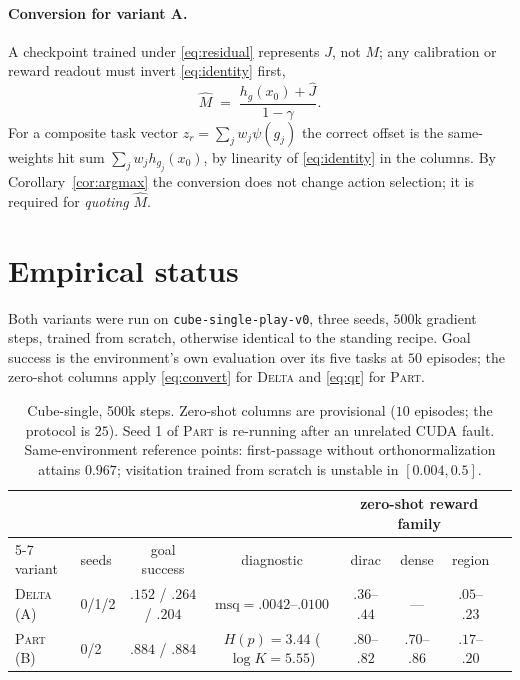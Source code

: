 \documentclass{article}
\begin{document}
\paragraph{Conversion for variant A.} A checkpoint trained under
\eqref{eq:residual} represents $J$, not $M$; any calibration or reward readout
must invert \eqref{eq:identity} first,
\begin{equation}
\widehat{M} \;=\; \frac{h_g(x_0)+\widehat{J}}{1-\gamma}.
\label{eq:convert}
\end{equation}
For a composite task vector $z_r=\sum_j w_j\psi(g_j)$ the correct offset is the
same-weights hit sum $\sum_j w_j h_{g_j}(x_0)$, by linearity of
\eqref{eq:identity} in the columns. By Corollary~\ref{cor:argmax} the conversion
does not change action selection; it is required for \emph{quoting} $\widehat M$.

\section{Empirical status}

Both variants were run on \texttt{cube-single-play-v0}, three seeds, $500$k
gradient steps, trained from scratch, otherwise identical to the standing
recipe. Goal success is the environment's own evaluation over its five tasks at
$50$ episodes; the zero-shot columns apply \eqref{eq:convert} for \textsc{Delta}
and \eqref{eq:qr} for \textsc{Part}.

\begin{table}[h]
\centering
\small
\setlength{\tabcolsep}{4.5pt}
\begin{tabular}{llcccccc}
\toprule
& & & & \multicolumn{3}{c}{zero-shot reward family} \\
\cmidrule(lr){5-7}
variant & seeds & goal success & diagnostic & dirac & dense & region \\
\midrule
\textsc{Delta} (A) & 0/1/2 & $.152$ / $.264$ / $.204$ & $\mathrm{msq}=.0042$--$.0100$ & $.36$--$.44$ & --- & $.05$--$.23$ \\
\textsc{Part} (B)  & 0/2   & $.884$ / $.884$          & $H(p)=3.44$ ($\log K{=}5.55$) & $.80$--$.82$ & $.70$--$.86$ & $.17$--$.20$ \\
\bottomrule
\end{tabular}
\caption{Cube-single, 500k steps. Zero-shot columns are provisional ($10$
episodes; the protocol is $25$). Seed 1 of \textsc{Part} is re-running after an
unrelated CUDA fault. Same-environment reference points: first-passage without
orthonormalization attains $0.967$; visitation trained from scratch is unstable
in $[0.004,0.5]$.}
\label{tab:results}
\end{table}
\end{document}
